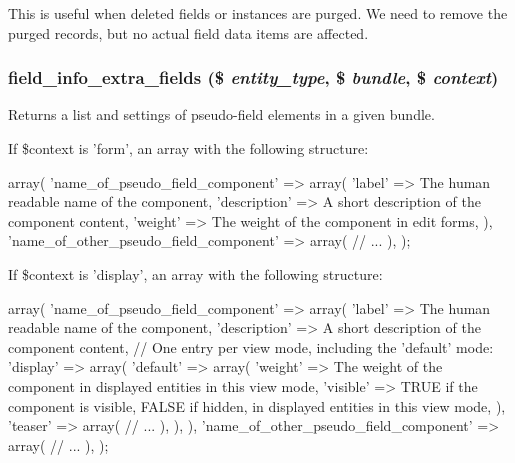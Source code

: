 This is useful when deleted fields or instances are purged. We need to remove the purged records, but no actual field data items are affected. \hypertarget{group__field__info_gae66c2dc5b6bdb9560a0561cefcf093f7}{
\subsubsection[{field\_\-info\_\-extra\_\-fields}]{\setlength{\rightskip}{0pt plus 5cm}field\_\-info\_\-extra\_\-fields (\$ {\em entity\_\-type}, \/  \$ {\em bundle}, \/  \$ {\em context})}}
\label{group__field__info_gae66c2dc5b6bdb9560a0561cefcf093f7}
Returns a list and settings of pseudo-\/field elements in a given bundle.

If \$context is 'form', an array with the following structure: 
\begin{DoxyCode}
   array(
     'name_of_pseudo_field_component' => array(
       'label' => The human readable name of the component,
       'description' => A short description of the component content,
       'weight' => The weight of the component in edit forms,
     ),
     'name_of_other_pseudo_field_component' => array(
       // ...
     ),
   );
\end{DoxyCode}


If \$context is 'display', an array with the following structure: 
\begin{DoxyCode}
   array(
     'name_of_pseudo_field_component' => array(
       'label' => The human readable name of the component,
       'description' => A short description of the component content,
       // One entry per view mode, including the 'default' mode:
       'display' => array(
         'default' => array(
           'weight' => The weight of the component in displayed entities in
             this view mode,
           'visible' => TRUE if the component is visible, FALSE if hidden, in
             displayed entities in this view mode,
         ),
         'teaser' => array(
           // ...
         ),
       ),
     ),
     'name_of_other_pseudo_field_component' => array(
       // ...
     ),
   );
\end{DoxyCode}



